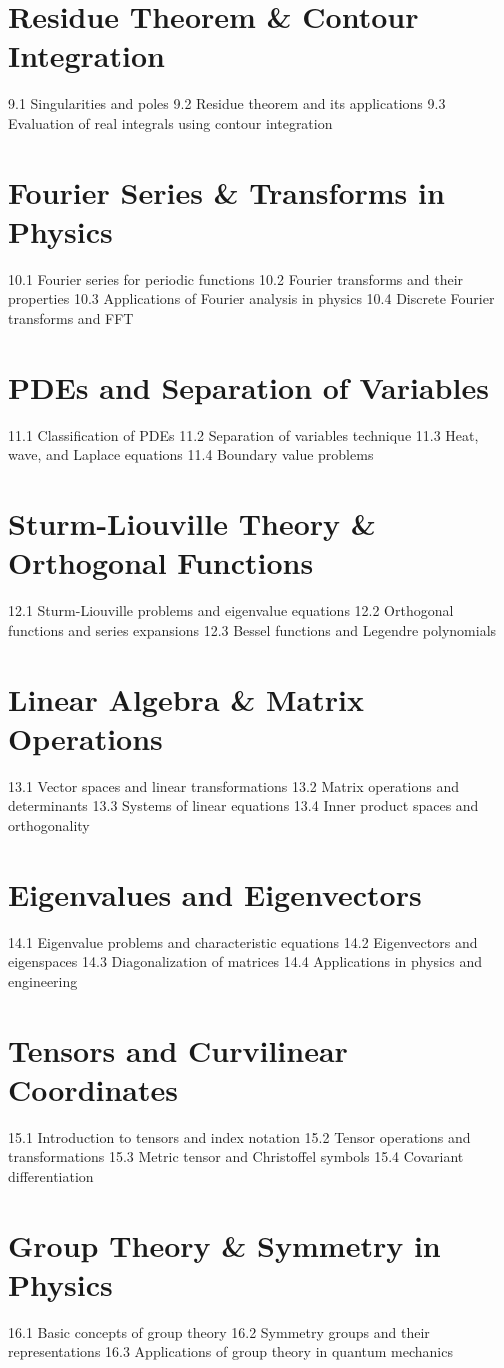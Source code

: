 \section{Residue Theorem \& Contour Integration}
9.1 Singularities and poles
9.2 Residue theorem and its applications
9.3 Evaluation of real integrals using contour integration
\section{Fourier Series \& Transforms in Physics}
10.1 Fourier series for periodic functions
10.2 Fourier transforms and their properties
10.3 Applications of Fourier analysis in physics
10.4 Discrete Fourier transforms and FFT
\section{PDEs and Separation of Variables}
11.1 Classification of PDEs
11.2 Separation of variables technique
11.3 Heat, wave, and Laplace equations
11.4 Boundary value problems
\section{Sturm-Liouville Theory \& Orthogonal Functions}
12.1 Sturm-Liouville problems and eigenvalue equations
12.2 Orthogonal functions and series expansions
12.3 Bessel functions and Legendre polynomials
\section{Linear Algebra \& Matrix Operations}
13.1 Vector spaces and linear transformations
13.2 Matrix operations and determinants
13.3 Systems of linear equations
13.4 Inner product spaces and orthogonality
\section{Eigenvalues and Eigenvectors}
14.1 Eigenvalue problems and characteristic equations
14.2 Eigenvectors and eigenspaces
14.3 Diagonalization of matrices
14.4 Applications in physics and engineering
\section{Tensors and Curvilinear Coordinates}
15.1 Introduction to tensors and index notation
15.2 Tensor operations and transformations
15.3 Metric tensor and Christoffel symbols
15.4 Covariant differentiation
\section{Group Theory \& Symmetry in Physics}
16.1 Basic concepts of group theory
16.2 Symmetry groups and their representations
16.3 Applications of group theory in quantum mechanics
